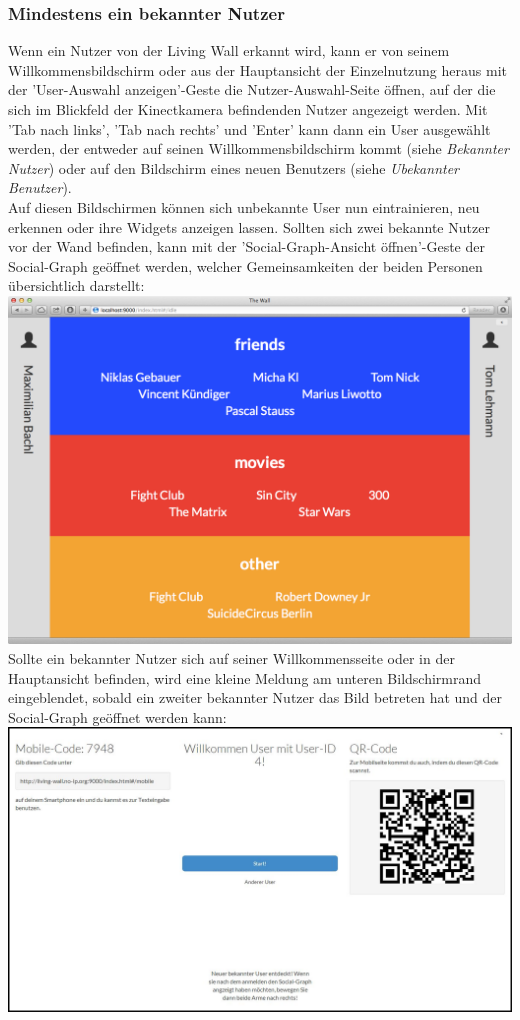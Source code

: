 \documentclass[10pt,a4paper]{report}
\begin{document}
		\subsubsection{Mindestens ein bekannter Nutzer}
		Wenn ein Nutzer von der Living Wall erkannt wird, kann er von seinem Willkommensbildschirm oder aus der Hauptansicht der Einzelnutzung heraus mit der 'User-Auswahl anzeigen'-Geste die Nutzer-Auswahl-Seite öffnen, auf der die sich im Blickfeld der Kinectkamera befindenden Nutzer angezeigt werden. Mit 'Tab nach links', 'Tab nach rechts' und 'Enter' kann dann ein User ausgewählt werden, der entweder auf seinen Willkommensbildschirm kommt (siehe \textit{Bekannter Nutzer}) oder auf den Bildschirm eines neuen Benutzers (siehe \textit{Ubekannter Benutzer}).\\
		Auf diesen Bildschirmen können sich unbekannte User nun eintrainieren, neu erkennen oder ihre Widgets anzeigen lassen.
		Sollten sich zwei bekannte Nutzer vor der Wand befinden, kann mit der 'Social-Graph-Ansicht öffnen'-Geste der Social-Graph geöffnet werden, welcher Gemeinsamkeiten der beiden Personen übersichtlich darstellt:\\
		\includegraphics[width=\linewidth]{socialgraph}\\
		Sollte ein bekannter Nutzer sich auf seiner Willkommensseite oder in der Hauptansicht befinden, wird eine kleine Meldung am unteren Bildschirmrand eingeblendet, sobald ein zweiter bekannter Nutzer das Bild betreten hat und der Social-Graph geöffnet werden kann:\\
		\includegraphics[width=\linewidth]{NewUser}
\end{document}
